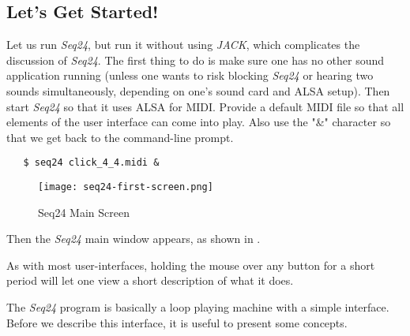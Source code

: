 \documentclass[
 11pt,
 twoside,
 a4paper,
 headinclude,
 footinclude,
 final                                 %
]{article}
\begin{document}
\subsection{Let's Get Started!}
\label{subsec:introduction_lets_get_started}

   Let us run \textsl{Seq24}, but run it without using \textsl{JACK}, which
   complicates the discussion of \textsl{Seq24}.  The first
   thing to do is make sure one has no other sound application running
   (unless one wants to risk blocking \textsl{Seq24} or hearing two sounds
   simultaneously, depending on one's sound card and ALSA setup).
   Then start \textsl{Seq24} so that it uses ALSA for
   MIDI.  Provide a default MIDI file so that all elements of the user
   interface can come into play.
   Also use the "\&" character so that we get back to the
   command-line prompt.

\begin{verbatim}
   $ seq24 click_4_4.midi &
\end{verbatim}

\begin{figure}[H]
   \centering 
   \texttt{[image: seq24-first-screen.png]}
   \caption{Seq24 Main Screen}
   \label{fig:seq24_main_screen}
\end{figure}

   
   Then the \textsl{Seq24} main window appears, as shown in
   .

   As with most user-interfaces, holding the mouse over any button for a
   short period will let one view a short description of what it does.

   The \textsl{Seq24} program is basically a loop playing machine with a 
   simple interface.  Before we describe this interface, it is useful to
   present some concepts.










\end{document}
